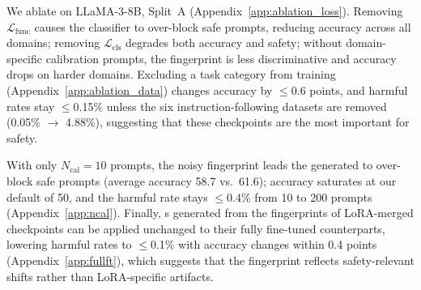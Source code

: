  We ablate \method{} on LLaMA-3-8B, Split~A (Appendix~\ref{app:ablation_loss}). Removing $\mathcal{L}_\text{func}$ causes the classifier to over-block safe prompts, reducing accuracy across all domains; removing $\mathcal{L}_\text{cls}$ degrades both accuracy and safety; without domain-specific calibration prompts, the fingerprint is less discriminative and accuracy drops on harder domains. Excluding a task category from training (Appendix~\ref{app:ablation_data}) changes accuracy by $\leq$0.6 points, and harmful rates stay $\leq$0.15\% unless the six instruction-following datasets are removed (0.05\% $\to$ 4.88\%), suggesting that these checkpoints are the most important for safety.

 With only $N_\text{cal}{=}10$ prompts, the noisy fingerprint leads the generated \ssn{} to over-block safe prompts (average accuracy 58.7 vs.\ 61.6); accuracy saturates at our default of 50, and the harmful rate stays $\leq$0.4\% from 10 to 200 prompts (Appendix~\ref{app:ncal}). Finally, \ssn{}s generated from the fingerprints of LoRA-merged checkpoints can be applied unchanged to their fully fine-tuned counterparts, lowering harmful rates to $\leq$0.1\% with accuracy changes within 0.4 points (Appendix~\ref{app:fullft}), which suggests that the fingerprint reflects safety-relevant shifts rather than LoRA-specific artifacts.
